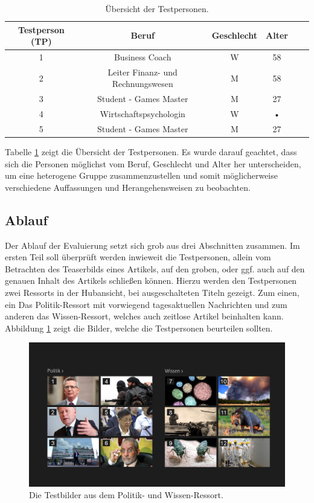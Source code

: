 \documentclass[12pt,a4paper,bibtotoc]{scrartcl}
\begin{document}
\begin{table}[h]
\centering
\begin{tabular}{|c|c|c|c|c|c|}
\hline 
\rule[-1ex]{0pt}{3.5ex} \textbf{Testperson (TP)} & \textbf{Beruf} & \textbf{Geschlecht} & \textbf{Alter} \\ 
\hline 
\rule[-1ex]{0pt}{2.5ex} 1 & Business Coach & W & 58 \\ 
\hline 
\rule[-1ex]{0pt}{2.5ex} 2 & Leiter Finanz- und Rechnungswesen & M & 58 \\ 
\hline 
\rule[-1ex]{0pt}{2.5ex} 3 & Student - Games Master & M & 27  \\ 
\hline 
\rule[-1ex]{0pt}{2.5ex} 4 & Wirtschaftspsychologin & W & • \\ 
\hline 
\rule[-1ex]{0pt}{2.5ex} 5 & Student - Games Master & M & 27 \\ 
\hline 
\end{tabular} 
\caption{Übersicht der Testpersonen.}
\label{tab:testpersonen}
\end{table}

Tabelle \ref{tab:testpersonen} zeigt die Übersicht der Testpersonen. Es wurde darauf geachtet, dass sich die Personen möglichst vom Beruf, Geschlecht und Alter her unterscheiden, um eine heterogene Gruppe zusammenzustellen und somit möglicherweise verschiedene Auffassungen und Herangehensweisen zu beobachten.


\subsection{Ablauf}
\label{subsec:ablauf}
Der Ablauf der Evaluierung setzt sich grob aus drei Abschnitten zusammen. Im ersten Teil soll überprüft werden inwieweit die Testpersonen, allein vom Betrachten des Teaserbilds eines Artikels, auf den groben, oder ggf. auch auf den genauen Inhalt des Artikels schließen können. Hierzu werden den Testpersonen zwei Ressorts in der Hubansicht, bei ausgeschalteten Titeln gezeigt. Zum einen, ein Das Politik-Ressort mit vorwiegend tagesaktuellen Nachrichten und zum anderen das Wissen-Ressort, welches auch zeitlose Artikel beinhalten kann. Abbildung \ref{fig:testbilder} zeigt die Bilder, welche die Testpersonen beurteilen sollten.

\begin{figure}[h]
	\centering
	\includegraphics[width=\textwidth]{Evaluierung/Testbilder/collage_politik_wissen_numbers.png} 
	\caption{Die Testbilder aus dem Politik- und Wissen-Ressort.}
	\label{fig:testbilder}
\end{figure}  
\end{document}
